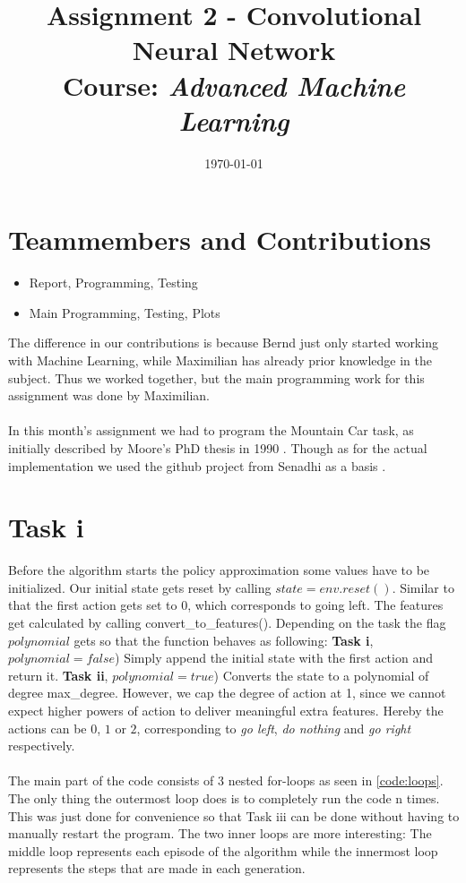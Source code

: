 \documentclass{article}
\title{Assignment 2 - Convolutional Neural Network\\
		{\large Course: \textit{Advanced Machine Learning}}}
\date{\today}
\begin{document}
	
	\maketitle
	
	\section{Teammembers and Contributions}
	\label{sec:TeammembersAndContributions}
	
	\begin{itemize}
		\item {} Report, Programming, Testing
		\item {} Main Programming, Testing, Plots
	\end{itemize}
	
	\noindent The difference in our contributions is because Bernd just only started working with Machine Learning, while Maximilian has already prior knowledge in the subject. Thus we worked together, but the main programming work for this assignment was done by Maximilian. \\
	\\
	In this month's assignment we had to program the Mountain Car task, as initially described by Moore's PhD thesis in 1990 \cite{Moore90efficientmemory-based}. Though as for the actual implementation we used the github project from Senadhi as a basis \cite{MountainCar-v02018}. 
	
	
	\section{Task i}
	\label{sec:Taski}
	Before the algorithm starts the policy approximation some values have to be initialized. Our initial state gets reset by calling $state = env.reset()$. Similar to that the first action gets set to $0$, which corresponds to going left. The features get calculated by calling convert\_to\_features(). Depending on the task the flag $polynomial$ gets so that the function behaves as following: \textbf{Task i}, $polynomial = false$) Simply append the initial state with the first action and return it. \textbf{Task ii}, $polynomial = true$) Converts the state to a polynomial of degree max\_degree. However, we cap the degree of action at 1, since we cannot expect higher powers of action to deliver meaningful extra features. Hereby the actions can be $0$, $1$ or $2$, corresponding to \textit{go left}, \textit{do nothing} and \textit{go right} respectively.\\
	\\
	The main part of the code consists of 3 nested for-loops as seen in \autoref{code:loops}. The only thing the outermost loop does is to completely run the code n times. This was just done for convenience so that Task iii can be done without having to manually restart the program. The two inner loops are more interesting: The middle loop represents each episode of the algorithm while the innermost loop represents the steps that are made in each generation. 
	
\end{document}
